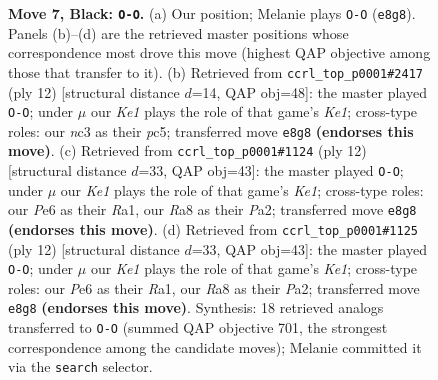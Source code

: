 \documentclass[11pt]{article}
\begin{document}
\begin{figure}[p]
\caption{\textbf{Move 7, Black: \texttt{O-O}.} (a) Our position; Melanie plays \texttt{O-O} (\texttt{e8g8}). Panels (b)--(d) are the retrieved master positions whose correspondence most drove this move (highest QAP objective among those that transfer to it). (b) Retrieved from \texttt{ccrl\_top\_p0001\#2417} (ply 12) [structural distance $d$=14, QAP obj=48]: the master played \texttt{O-O}; under $\mu$ our \emph{Ke1} plays the role of that game's \emph{Ke1}; cross-type roles: our \emph{n}c3 as their \emph{p}c5; transferred move \texttt{e8g8} \textbf{(endorses this move)}. (c) Retrieved from \texttt{ccrl\_top\_p0001\#1124} (ply 12) [structural distance $d$=33, QAP obj=43]: the master played \texttt{O-O}; under $\mu$ our \emph{Ke1} plays the role of that game's \emph{Ke1}; cross-type roles: our \emph{P}e6 as their \emph{R}a1, our \emph{R}a8 as their \emph{P}a2; transferred move \texttt{e8g8} \textbf{(endorses this move)}. (d) Retrieved from \texttt{ccrl\_top\_p0001\#1125} (ply 12) [structural distance $d$=33, QAP obj=43]: the master played \texttt{O-O}; under $\mu$ our \emph{Ke1} plays the role of that game's \emph{Ke1}; cross-type roles: our \emph{P}e6 as their \emph{R}a1, our \emph{R}a8 as their \emph{P}a2; transferred move \texttt{e8g8} \textbf{(endorses this move)}. Synthesis: 18 retrieved analogs transferred to \texttt{O-O} (summed QAP objective 701, the strongest correspondence among the candidate moves); Melanie committed it via the \texttt{search} selector.}
\label{fig:thought-m13}
\end{figure}

\clearpage
\end{document}
